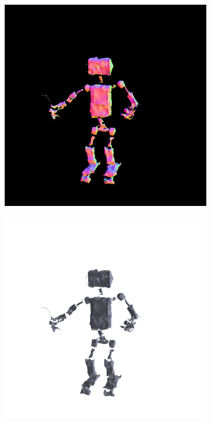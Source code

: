\begin{figure}[ht]
\begin{subfigure}[b]{0.20\textwidth}
        \includegraphics[width=\textwidth]{figures/appendix/fantasia_coarse_robot_10000_part2.png}
        \caption{}
    \end{subfigure}
    \begin{subfigure}[b]{0.20\textwidth}
        \centering
        \includegraphics[width=\textwidth]{figures/appendix/fantasia_refine_robot_0_part1.png}

\end{subfigure}
\end{figure}
